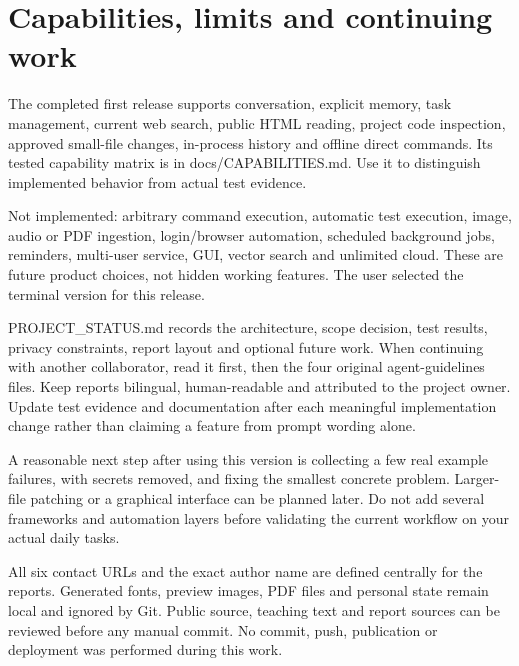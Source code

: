 \chapter{Capabilities, limits and continuing work}

The completed first release supports conversation, explicit memory, task management, current web search, public HTML reading, project code inspection, approved small-file changes, in-process history and offline direct commands. Its tested capability matrix is in docs/CAPABILITIES.md. Use it to distinguish implemented behavior from actual test evidence.

Not implemented: arbitrary command execution, automatic test execution, image, audio or PDF ingestion, login/browser automation, scheduled background jobs, reminders, multi-user service, GUI, vector search and unlimited cloud. These are future product choices, not hidden working features. The user selected the terminal version for this release.

PROJECT\_STATUS.md records the architecture, scope decision, test results, privacy constraints, report layout and optional future work. When continuing with another collaborator, read it first, then the four original agent-guidelines files. Keep reports bilingual, human-readable and attributed to the project owner. Update test evidence and documentation after each meaningful implementation change rather than claiming a feature from prompt wording alone.

A reasonable next step after using this version is collecting a few real example failures, with secrets removed, and fixing the smallest concrete problem. Larger-file patching or a graphical interface can be planned later. Do not add several frameworks and automation layers before validating the current workflow on your actual daily tasks.

All six contact URLs and the exact author name are defined centrally for the reports. Generated fonts, preview images, PDF files and personal state remain local and ignored by Git. Public source, teaching text and report sources can be reviewed before any manual commit. No commit, push, publication or deployment was performed during this work.

